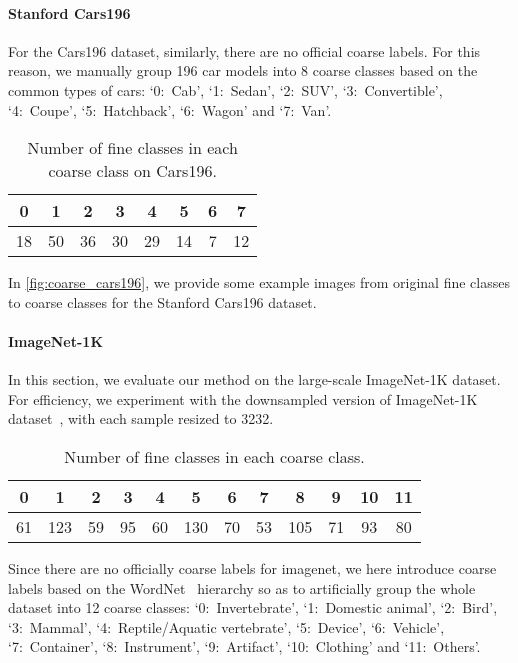 \documentclass[10pt,twocolumn,letterpaper]{article}
\begin{document}
\paragraph{Stanford Cars196}
For the Cars196 dataset, similarly, there are no official coarse labels. For this reason, we manually group 196 car models into 8 coarse classes based on the common types of cars: `0:~Cab', `1:~Sedan', `2:~SUV', `3:~Convertible', `4:~Coupe', `5:~Hatchback', `6:~Wagon' and `7:~Van'.
\begin{table}[htbp]
\centering
\begin{tabular}{@{}cccccccc@{}}
\toprule
0  & 1  & 2  & 3  & 4  & 5  & 6 & 7  \\ \midrule
18 & 50 & 36 & 30 & 29 & 14 & 7 & 12 \\ \bottomrule
\end{tabular}
\caption{Number of fine classes in each coarse class on Cars196.}
\label{tab:carssplit}
\end{table}
In \cref{fig:coarse_cars196}, we provide some example images from original fine classes to coarse classes for the Stanford Cars196 dataset. 



\paragraph{ImageNet-1K}
In this section, we evaluate our method on the large-scale ImageNet-1K dataset. For efficiency, we experiment with the downsampled version of ImageNet-1K dataset~\cite{chrabaszcz2017downsampled}, with each sample resized to 3232. 
\begin{table}[htbp]
\centering
\begin{tabular}{@{}cccccccccccc@{}}
\toprule
0  & 1   & 2  & 3  & 4  & 5   & 6  & 7  & 8   & 9  & 10 & 11 \\ \midrule
61 & 123 & 59 & 95 & 60 & 130 & 70 & 53 & 105 & 71 & 93 & 80 \\ \bottomrule
\end{tabular}
\caption{Number of fine classes in each coarse class.}
\label{tab:imagenetsplit}
\end{table}
Since there are no officially coarse labels for imagenet, we here introduce coarse labels based on the WordNet~\cite{miller1998wordnet} hierarchy so as to artificially group the whole dataset into 12 coarse classes: `0:~Invertebrate', `1:~Domestic animal', `2:~Bird', `3:~Mammal', `4:~Reptile/Aquatic vertebrate', `5:~Device', `6:~Vehicle', `7:~Container', `8:~Instrument', `9:~Artifact', `10:~Clothing' and `11:~Others'. 
\end{document}
